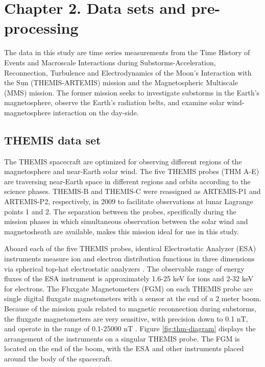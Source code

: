 \chapter{Chapter 2. Data sets and pre-processing}

The data in this study are time series measurements from the Time History of Events and Macroscale Interactions during Substorms-Acceleration, Reconnection, Turbulence and Electrodynamics of the Moon’s Interaction with the Sun (THEMIS-ARTEMIS) mission and the Magnetospheric Multiscale (MMS) mission. The former mission seeks to investigate substorms in the Earth's magnetosphere, observe the Earth's radiation belts, and examine solar wind-magnetosphere interaction on the day-side. 


\section{THEMIS data set}
The THEMIS spacecraft are optimized for observing different regions of the magnetosphere and near-Earth solar wind. The five THEMIS probes (THM A-E) are traversing near-Earth space in different regions and orbits according to the science phases. THEMIS-B and THEMIS-C were reassigned as ARTEMIS-P1 and ARTEMIS-P2, respectively, in 2009 to facilitate observations at lunar Lagrange points 1 and 2. The separation between the probes, specifically during the mission phases in which simultaneous observation between the solar wind and magnetosheath are available, makes this mission ideal for use in this study.

Aboard each of the five THEMIS probes, identical Electrostatic Analyzer (ESA) instruments measure ion and electron distribution functions in three dimensions via spherical top-hat electrostatic analyzers \citep{McFadden:2008}. The observable range of energy fluxes of the ESA instrument is approximately 1.6-25 keV for ions and 2-32 keV for electrons. The Fluxgate Magnetometers (FGM) on each THEMIS probe \citep{Auster:2008} are single digital fluxgate magnetometers with a sensor at the end of a 2 meter boom. Because of the mission goals related to magnetic reconnection during substorms, the fluxgate magnetometers are very sensitive, with precision down to 0.1 nT, and operate in the range of 0.1-25000 nT \citep{Auster:2008}. Figure \ref{fig:thm-diagram} displays the arrangement of the instruments on a singular THEMIS probe. The FGM is located on the end of the boom, with the ESA and other instruments placed around the body of the spacecraft.

